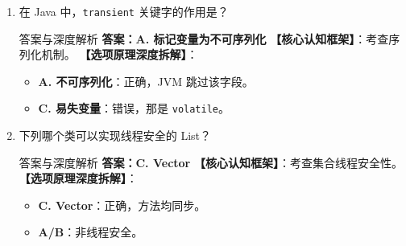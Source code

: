 ﻿\documentclass[12pt, a4paper]{ctexart}
\newcommand{\code}[1]{\texttt{#1}}
\begin{document}
\begin{enumerate}[label=\arabic*., itemsep=1.5em]
	\item 在 Java 中，\code{transient} 关键字的作用是？
	      \begin{bluebox}{答案与深度解析}
		      \textbf{答案：A. 标记变量为不可序列化}
		      \textbf{【核心认知框架】}：考查序列化机制。
		      \textbf{【选项原理深度拆解】}：
		      \begin{itemize}[leftmargin=*, nosep]
			      \item \textbf{A. 不可序列化}：正确，JVM 跳过该字段。
			      \item \textbf{C. 易失变量}：错误，那是 \code{volatile}。
		      \end{itemize}
	      \end{bluebox}

	\item 下列哪个类可以实现线程安全的 List？
	      \begin{bluebox}{答案与深度解析}
		      \textbf{答案：C. Vector}
		      \textbf{【核心认知框架】}：考查集合线程安全性。
		      \textbf{【选项原理深度拆解】}：
		      \begin{itemize}[leftmargin=*, nosep]
			      \item \textbf{C. Vector}：正确，方法均同步。
			      \item \textbf{A/B}：非线程安全。
		      \end{itemize}
	      \end{bluebox}


\end{enumerate}
\end{document}
